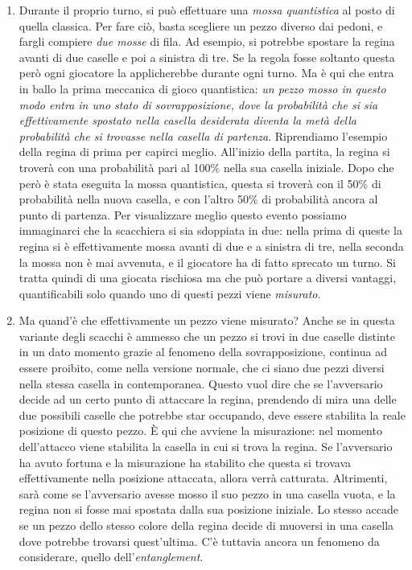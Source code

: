 \documentclass{book}
\theoremstyle{definition}
\theoremstyle{definition}
\theoremstyle{definition}
\theoremstyle{plain}
\theoremstyle{plain}
\theoremstyle{plain}
\theoremstyle{plain}
\begin{document}
\begin{enumerate}
    \item Durante il proprio turno, si può effettuare una \emph{mossa quantistica} al posto di quella classica. Per fare ciò, basta scegliere un pezzo diverso dai pedoni, e fargli compiere \emph{due mosse} di fila. Ad esempio, si potrebbe spostare la regina avanti di due caselle e poi a sinistra di tre. Se la regola fosse soltanto questa però ogni giocatore la applicherebbe durante ogni turno. Ma è qui che entra in ballo la prima meccanica di gioco quantistica: \emph{un pezzo mosso in questo modo entra in uno stato di sovrapposizione, dove la probabilità che si sia effettivamente spostato nella casella desiderata diventa la metà della probabilità che si trovasse nella casella di partenza}. Riprendiamo l'esempio della regina di prima per capirci meglio. All'inizio della partita, la regina si troverà con una probabilità pari al 100\% nella sua casella iniziale. Dopo che però è stata eseguita la mossa quantistica, questa si troverà con il 50\% di probabilità nella nuova casella, e con l'altro 50\% di probabilità ancora al punto di partenza. Per visualizzare meglio questo evento possiamo immaginarci che la scacchiera si sia sdoppiata in due: nella prima di queste la regina si è effettivamente mossa avanti di due e a sinistra di tre, nella seconda la mossa non è mai avvenuta, e il giocatore ha di fatto sprecato un turno. Si tratta quindi di una giocata rischiosa ma che può portare a diversi vantaggi, quantificabili solo quando uno di questi pezzi viene \emph{misurato}.
    \item Ma quand'è che effettivamente un pezzo viene misurato? Anche se in questa variante degli scacchi è ammesso che un pezzo si trovi in due caselle distinte in un dato momento grazie al fenomeno della sovrapposizione, continua ad essere proibito, come nella versione normale, che ci siano due pezzi diversi nella stessa casella in contemporanea. Questo vuol dire che se l'avversario decide ad un certo punto di attaccare la regina, prendendo di mira una delle due possibili caselle che potrebbe star occupando, deve essere stabilita la reale posizione di questo pezzo. È qui che avviene la misurazione: nel momento dell'attacco viene stabilita la casella in cui si trova la regina. Se l'avversario ha avuto fortuna e la misurazione ha stabilito che questa si trovava effettivamente nella posizione attaccata, allora verrà catturata. Altrimenti, sarà come se l'avversario avesse mosso il suo pezzo in una casella vuota, e la regina non si fosse mai spostata dalla sua posizione iniziale. Lo stesso accade se un pezzo dello stesso colore della regina decide di muoversi in una casella dove potrebbe trovarsi quest'ultima. C'è tuttavia ancora un fenomeno da considerare, quello dell'\emph{entanglement}.

\end{enumerate}
\end{document}
